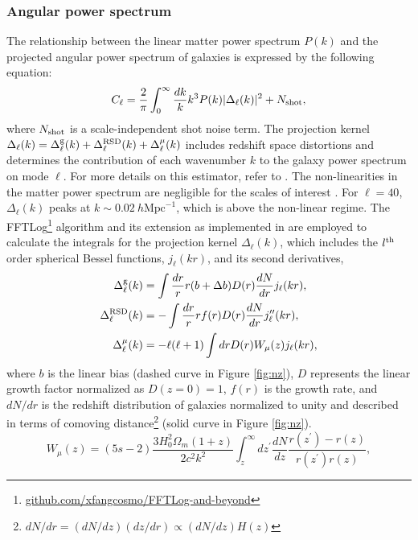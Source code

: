 \subsubsection{Angular power spectrum} 
The relationship between the linear matter power spectrum $P(k)$ and the projected angular power spectrum of galaxies is expressed by the following equation:
\begin{equation}\label{eq:cell}
C_{\ell} = \frac{2}{\pi}\int_{0}^{\infty}\frac{dk}{k}k^{3}P(k)|\Delta_{\ell}(k)|^{2} + N_{\rm shot},
\end{equation}
where $N_{\rm shot}$ is a scale-independent shot noise term. The projection kernel $\Delta_{\ell}(k) = \Delta^{\rm g}_{\ell}(k) + \Delta^{\rm RSD}_{\ell}(k) + \Delta^{\mu}_{\ell}(k)$ includes redshift space distortions  and determines the contribution of each wavenumber $k$ to the galaxy power spectrum on mode $\ell$. For more details on this estimator, refer to \cite{Padmanabhan2007}. The non-linearities in the matter power spectrum are negligible for the scales of interest \citep[see, e.g.,][]{Ho2015JCAP...05..040H}. For $\ell=40$, $\Delta_{\ell}(k)$ peaks at $k\sim 0.02~ h\text{Mpc}^{-1}$, which is above the non-linear regime. The FFTLog\footnote{\href{https://github.com/xfangcosmo/FFTLog-and-beyond}{github.com/xfangcosmo/FFTLog-and-beyond}} algorithm and its extension as implemented in \cite{fang2020beyond} are employed to calculate the integrals for the projection kernel $\Delta_{\ell}(k)$, which includes the $l^{\rm th}$ order spherical Bessel functions, $ j_{\ell}(kr)$, and its second derivatives,
\begin{align}
    \Delta^{\rm g}_{\ell}(k) &= \int \frac{dr}{r} r (b+\Delta b) D(r) \frac{dN}{dr} j_{\ell}(kr),\\
    \Delta^{\rm RSD}_{\ell}(k) &= - \int \frac{dr}{r} r f(r) D(r) \frac{dN}{dr} j^{\prime\prime}_{\ell}(kr),\\
    \Delta^{\mu}_{\ell}(k) &= - \ell(\ell+1) \int dr D(r) W_{\mu}(z) j_{\ell}(kr),
\end{align}
where $b$ is the linear bias (dashed curve in Figure \ref{fig:nz}), $D$ represents the linear growth factor normalized as $D(z=0)=1$, $f(r)$ is the growth rate, and $dN/dr$ is the redshift distribution of galaxies normalized to unity and described in terms of comoving distance\footnote{$dN/dr = (dN/dz)(dz/dr) \propto (dN/dz)H(z)$} (solid curve in Figure \ref{fig:nz}). 
\begin{equation}
W_{\mu}(z) = (5s-2)\frac{3H^{2}_{0}\Omega_{m}(1+z)}{2c^{2}k^{2}} \int_{z}^{\infty} dz^{\prime}\frac{dN}{dz} \frac{r(z^{\prime}) - r(z)}{r(z^{\prime})r(z)},
\end{equation}
